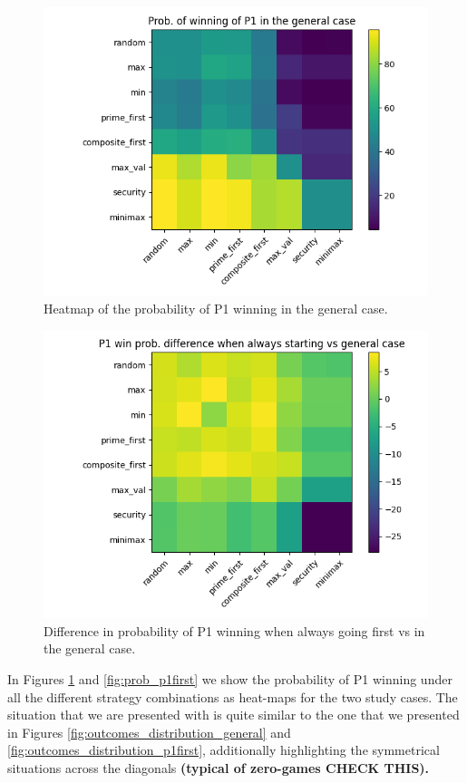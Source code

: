 \begin{figure}
	\centering
	\includegraphics[width=1\linewidth]{img/prob_general.png}
	\caption{Heatmap of the probability of P1 winning in the general case.}
	\label{fig:prob_general}
\end{figure}

\begin{figure}
	\centering
	\includegraphics[width=1\linewidth]{img/prob_diff.png}
	\caption{Difference in probability of P1 winning when always going first vs in the general case.}
	\label{fig:prob_diff}
\end{figure}

In Figures \ref{fig:prob_general} and \ref{fig:prob_p1first} we show the probability of P1 winning under all the different strategy combinations as heat-maps for the two study cases.
The situation that we are presented with is quite similar to the one that we presented in Figures \ref{fig:outcomes_distribution_general} and \ref{fig:outcomes_distribution_p1first}, additionally highlighting the symmetrical situations across the diagonals \textbf{(typical of zero-games CHECK THIS).}

